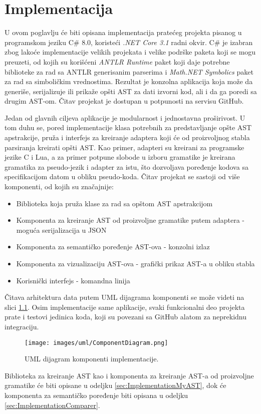 \chapter{Implementacija}
\label{chp:Implementation}

U ovom poglavlju će biti opisana implementacija pratećeg projekta pisanog u programskom jeziku C\# 8.0, koristeći \emph{.NET Core 3.1} radni okvir. C\# je izabran zbog lakoće implementacije velikih projekata i velike podrške paketa koji se mogu preuzeti, od kojih su korišćeni \emph{ANTLR Runtime} paket koji daje potrebne biblioteke za rad sa ANTLR generisanim parserima i \emph{Math.NET Symbolics} paket za rad sa simboličkim vrednostima. Rezultat je konzolna aplikacija koja može da generiše, serijalizuje ili prikaže opšti AST za dati izvorni kod, ali i da ga poredi sa drugim AST-om. Čitav projekat je dostupan u potpunosti na servisu GitHub.

Jedan od glavnih ciljeva aplikacije je modularnost i jednostavna proširivost. U tom duhu se, pored implementacije klasa potrebnih za predstavljanje opšte AST apstrakcije, pruža i interfejs za kreiranje adaptera koji će od proizvoljnog stabla parsiranja kreirati opšti AST. Kao primer, adapteri su kreirani za programske jezike C i Lua, a za primer potpune slobode u izboru gramatike je kreirana gramatika za pseudo-jezik i adapter za istu, što dozvoljava poređenje kodova sa specifikacijom datom u obliku pseudo-koda. Čitav projekat se sastoji od više komponenti, od kojih su značajnije:
\begin{itemize}
    \item Biblioteka koja pruža klase za rad sa opštom AST apstrakcijom
    \item Komponenta za kreiranje AST od proizvoljne gramatike putem adaptera - moguća serijalizacija u JSON
    \item Komponenta za semantičko poređenje AST-ova - konzolni izlaz
    \item Komponenta za vizualizaciju AST-ova - grafički prikaz AST-a u obliku stabla
    \item Korisnički interfejs - komandna linija
\end{itemize}

Čitava arhitektura data putem UML dijagrama komponenti se može videti na slici \ref{fig:ImplementationComponents}. Osim implementacije same aplikacije, svaki funkcionalni deo projekta prate i testovi jedinica koda, koji su povezani sa GitHub alatom za neprekidnu integraciju.

\begin{figure}[h!]
\centering
\texttt{[image: images/uml/ComponentDiagram.png]}
\caption{UML dijagram komponenti implementacije.}
\label{fig:ImplementationComponents}
\end{figure}

Biblioteka za kreiranje AST kao i komponenta za kreiranje AST-a od proizvoljne gramatike će biti opisane u odeljku \ref{sec:ImplementationMyAST}, dok će komponenta za semantičko poređenje biti opisana u odeljku \ref{sec:ImplementationComparer}.




